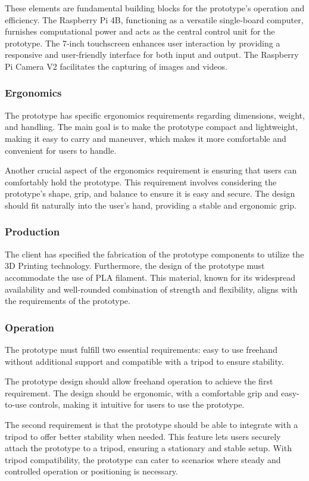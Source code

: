 These elements are fundamental building blocks for the prototype's operation and efficiency. The Raspberry Pi 4B, functioning as a versatile single-board computer, furnishes computational power and acts as the central control unit for the prototype. The 7-inch touchscreen enhances user interaction by providing a responsive and user-friendly interface for both input and output. The Raspberry Pi Camera V2 facilitates the capturing of images and videos.

\subsubsection{Ergonomics}
The prototype has specific ergonomics requirements regarding dimensions, weight, and handling. The main goal is to make the prototype compact and lightweight, making it easy to carry and maneuver, which makes it more comfortable and convenient for users to handle.

Another crucial aspect of the ergonomics requirement is ensuring that users can comfortably hold the prototype. This requirement involves considering the prototype's shape, grip, and balance to ensure it is easy and secure. The design should fit naturally into the user's hand, providing a stable and ergonomic grip.

\subsubsection{Production}
The client has specified the fabrication of the prototype components to utilize the 3D Printing technology. Furthermore, the design of the prototype must accommodate the use of PLA filament. This material, known for its widespread availability and well-rounded combination of strength and flexibility, aligns with the requirements of the prototype.

\subsubsection{Operation}
The prototype must fulfill two essential requirements: easy to use freehand without additional support and compatible with a tripod to ensure stability.

The prototype design should allow freehand operation to achieve the first requirement. The design should be ergonomic, with a comfortable grip and easy-to-use controls, making it intuitive for users to use the prototype.

The second requirement is that the prototype should be able to integrate with a tripod to offer better stability when needed. This feature lets users securely attach the prototype to a tripod, ensuring a stationary and stable setup. With tripod compatibility, the prototype can cater to scenarios where steady and controlled operation or positioning is necessary.

